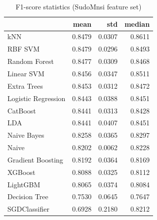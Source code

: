 \begin{table}
\caption{F1-score statistics (SudoMnsi feature set)}
\label{tab:f1_SudoMnsi_stats}
\begin{tabular}{lrrr}
\toprule
 & mean & std & median \\
\midrule
kNN & 0.8479 & 0.0307 & 0.8611 \\
RBF SVM & 0.8479 & 0.0296 & 0.8493 \\
Random Forest & 0.8477 & 0.0309 & 0.8468 \\
Linear SVM & 0.8456 & 0.0347 & 0.8511 \\
Extra Trees & 0.8453 & 0.0312 & 0.8472 \\
Logistic Regression & 0.8443 & 0.0388 & 0.8451 \\
CatBoost & 0.8441 & 0.0313 & 0.8428 \\
LDA & 0.8441 & 0.0407 & 0.8451 \\
Naive Bayes & 0.8258 & 0.0365 & 0.8297 \\
Naive & 0.8202 & 0.0062 & 0.8228 \\
Gradient Boosting & 0.8192 & 0.0364 & 0.8169 \\
XGBoost & 0.8088 & 0.0325 & 0.8112 \\
LightGBM & 0.8065 & 0.0374 & 0.8084 \\
Decision Tree & 0.7530 & 0.0645 & 0.7647 \\
SGDClassifier & 0.6928 & 0.2180 & 0.8212 \\
\bottomrule
\end{tabular}
\end{table}
